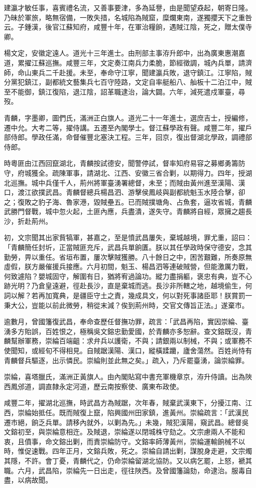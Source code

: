 \begin{pinyinscope}
建瀛才敏任事，喜賓禮名流，又善事要津，多為延譽，由是聞望猋起，朝寄日隆。乃昧於軍旅，略無宿備，一敗失措，名城陷為賊窟，糜爛東南，遂獨攖天下之重咎云。子鍾漢，後官江蘇知府，咸豐十年，在軍治糧餉，遇賊江陰，死之，贈太僕寺卿。

楊文定，安徽定遠人。道光十三年進士。由刑部主事洊升郎中，出為廣東惠潮嘉道，累擢江蘇巡撫。咸豐三年，文定奏江南兵力柔脆，節經徵調，城內兵單，請濟師，命山東兵二千赴援。未至，奉命守江寧，聞建瀛兵敗，退守鎮江。江寧陷，賊分黨犯鎮江，副都統文藝集兵七百守陸路，文定自率艇船八、舢板十二泊江中，賊至不能御，鎮江復陷，退江陰，詔革職逮治，論大闢。六年，減死遣戍軍臺，尋歿。

青麟，字墨卿，圖們氏，滿洲正白旗人。道光二十一年進士，選庶吉士，授編修，遷中允。大考二等，擢侍講。五遷至內閣學士。督江蘇學政有聲。咸豐二年，擢戶部侍郎。學政任滿，命督催豐北塞決工程。三年，回京，復出督湖北學政，調禮部侍郎。

時粵匪由江西回竄湖北，青麟按試德安，聞警停試，督率知府易容之募鄉勇籌防守，府城獲全。疏陳軍事，請湖北、江西、安徽三省合剿，以期得力。四年，授湖北巡撫。城中兵僅千人，荊州將軍臺湧署總督，未至；而賊由黃州進至漢陽、漢口，渡江欲撲武昌。青麟督總兵楊昌泗、游擊侯鳳岐與副都統魁玉水陸合擊，卻之；復敗之豹子海、魯家港，毀賊壘五。已而賊撲塘角、占魚套，逼攻省城，青麟武勝門督戰，城中忽火起，土匪內應，兵盡潰，遂失守。青麟將自經，眾擁之趨長沙，折赴荊州。

初，文宗聞其出家貲犒軍，甚嘉之，至是憤武昌屢失，棄城越境，罪尤重，詔曰：「青麟簡任封圻，正當賊匪充斥，武昌兵單餉匱。朕以其任學政時保守德安，念其勤勞，畀以重任。省垣布置，屢次擊賊獲勝。八十餘日之中，困苦艱難，所奏原無虛假，朕方嚴催援兵接應。六月初間，魁玉、楊昌泗等連破賊營，但能激厲力戰，何致遽陷？嬰城固守，解圍有日，猶將宥過論功。縱力盡捐軀，褒忠有典，豈不心跡光明？乃倉皇遠避，徑赴長沙，直是棄城而逃。長沙非所轄之地，越境偷生，何詞以解？若再加寬典，是疆臣守土之責，幾成具文，何以對死事諸臣耶！朕賞罰一秉大公，豈能以前此微勞，稍從末減？俟到荊州時，交官文傳旨正法。」遂棄市。

逾數月，曾國籓復武昌，奉命查歷任督撫功罪，疏言：「武昌再陷，實因崇綸、臺湧多方貽誤，百姓恨之，極稱吳文鎔忠勤愛國，於青麟亦多恕辭。查文鎔既沒，青麟幫辦軍務，崇綸百端齟：求弁兵以護衛，不與；請銀兩以制械，不與；或軍務不使聞知，或經旬不得相見。自賊踞漢陽、漢口，縱橫蹂躪，廬舍蕩然。百姓尚恃有青麟督兵驅逐，出示憐民。崇綸則並此無之矣。」疏入，乃斥罷臺湧，論崇綸罪。

崇綸，喜塔臘氏，滿洲正黃旗人。由內閣貼寫中書充軍機章京，洊升侍讀。出為陜西鳳邠道，調直隸永定河道，歷云南按察使、廣東布政使。

咸豐二年，擢湖北巡撫，時武昌方為賊踞，次年春，賊棄武漢東下，分擾江南、江西，崇綸始抵任。既而賊復上竄，陷興國州田家鎮，進黃州。崇綸疏言：「武漢民遷市絕，餉乏兵單。請移內就外，以剿為先。」未幾，賊犯漢陽，窺武昌。總督吳文鎔初至，與崇綸意相迕。及賊退，崇綸遂以閉城株守劾之。文宗慮兩人不能和衷，且僨事，命文鎔出剿，而責崇綸防守。文鎔率師薄黃州，崇綸運輸餉械不以時，惟促速戰。四年正月，文鎔兵敗，死之。崇綸自請出剿，謀脫身走避，文宗燭其隱，不許。會丁憂，青麟代之，仍命崇綸留湖北協防。又以病乞罷，上怒，褫其職。六月，武昌陷，崇綸先一日出走，徑往陜西。及曾國籓論劾，命逮治。服毒自盡，以病故聞。


\end{pinyinscope}
